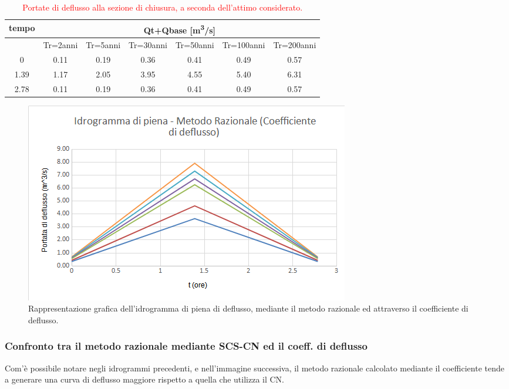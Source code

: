 \begin{table}[H] \centering
    \caption{\textcolor{red}{Portate di deflusso alla sezione di chiusura, a seconda dell'attimo considerato.}}
    \begin{tabular}{ccccccc}
        \toprule
    tempo & \multicolumn{6}{c}{Qt+Qbase [\unit{m^3/s}]}    \\
    \midrule
& Tr=2anni & Tr=5anni & Tr=30anni & Tr=50anni & Tr=100anni & Tr=200anni \\
    0                      & 0.11     & 0.19     & 0.36      & 0.41      & 0.49       & 0.57       \\
    1.39                   & 1.17     & 2.05     & 3.95      & 4.55      & 5.40       & 6.31       \\
    2.78                   & 0.11     & 0.19     & 0.36      & 0.41      & 0.49       & 0.57 \\
    \bottomrule     
    \end{tabular}
\end{table}

\begin{figure}[H]  \centering
    \includegraphics[scale=0.75]{immagini/metodo_razionale_coefficiente_deflusso.png}
    \caption{Rappresentazione grafica dell'idrogramma di piena di deflusso, mediante il metodo razionale ed attraverso il coefficiente di deflusso.}
    \label{metodo_razionale_coefficiete_deflusso}
\end{figure}

\subsubsection{Confronto tra il metodo razionale mediante SCS-CN ed il coeff. di deflusso}
Com'è possibile notare negli idrogrammi precedenti, e nell'immagine successiva, il metodo razionale calcolato mediante il coefficiente tende a generare una curva di deflusso maggiore rispetto a quella che utilizza il CN.

